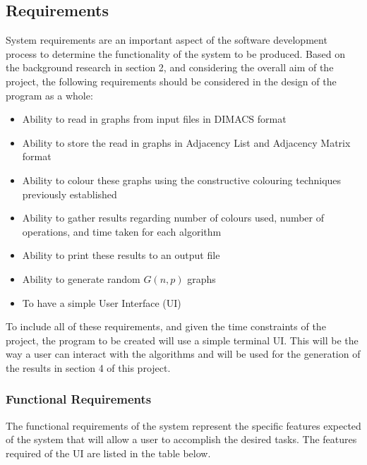 \subsection{Requirements}
System requirements are an important aspect of the software development process to determine the functionality of the system to be produced. Based on the background research in section 2, and considering the overall aim of the project, the following requirements should be considered in the design of the program as a whole:
\begin{itemize}
    \item Ability to read in graphs from input files in DIMACS format
    \item Ability to store the read in graphs in Adjacency List and Adjacency Matrix format
    \item Ability to colour these graphs using the constructive colouring techniques previously established
    \item Ability to gather results regarding number of colours used, number of operations, and time taken for each algorithm
    \item Ability to print these results to an output file
    \item Ability to generate random $G(n, p)$ graphs
    \item To have a simple User Interface (UI)
\end{itemize}

To include all of these requirements, and given the time constraints of the project, the program to be created will use a simple terminal UI. This will be the way a user can interact with the algorithms and will be used for the generation of the results in section 4 of this project.  

\subsubsection{Functional Requirements}
The functional requirements of the system represent the specific features expected of the system that will allow a user to accomplish the desired tasks. The features required of the UI are listed in the table below.

